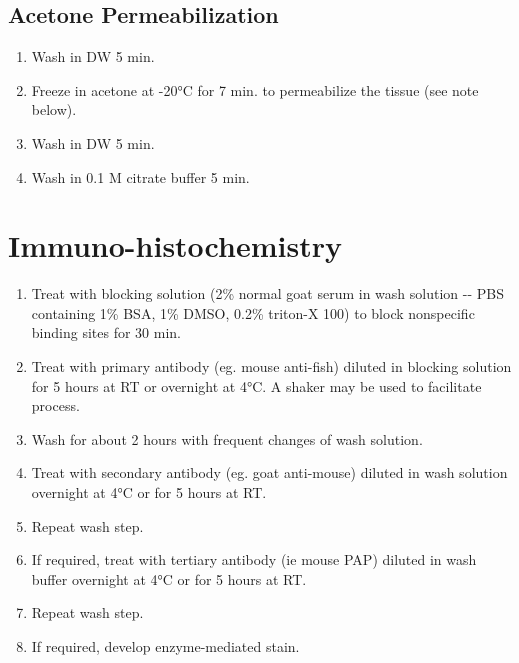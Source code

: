 \documentclass[
  letterpaper,
  DIV=11,
  numbers=noendperiod]{scrreprt}
\providecommand{\tightlist}{%
  \setlength{\itemsep}{0pt}\setlength{\parskip}{0pt}}\usepackage{longtable,booktabs,array}
\begin{document}
\hypertarget{acetone-permeabilization}{%
\subsection{Acetone Permeabilization}\label{acetone-permeabilization}}

\begin{enumerate}
\def\labelenumi{\arabic{enumi}.}
\setcounter{enumi}{4}
\tightlist
\item
  Wash in DW 5 min.
\item
  Freeze in acetone at -20°C for 7 min. to permeabilize the tissue (see
  note below).
\item
  Wash in DW 5 min.
\item
  Wash in 0.1 M citrate buffer 5 min.
\end{enumerate}

\hypertarget{immuno-histochemistry}{%
\section{Immuno-histochemistry}\label{immuno-histochemistry}}

\begin{enumerate}
\def\labelenumi{\arabic{enumi}.}
\setcounter{enumi}{8}
\tightlist
\item
  Treat with blocking solution (2\% normal goat serum in wash solution
  -\/- PBS containing 1\% BSA, 1\% DMSO, 0.2\% triton-X 100) to block
  nonspecific binding sites for 30 min.
\item
  Treat with primary antibody (eg. mouse anti-fish) diluted in blocking
  solution for 5 hours at RT or overnight at 4°C. A shaker may be used
  to facilitate process.
\item
  Wash for about 2 hours with frequent changes of wash solution.
\item
  Treat with secondary antibody (eg. goat anti-mouse) diluted in wash
  solution overnight at 4°C or for 5 hours at RT.
\item
  Repeat wash step.
\item
  If required, treat with tertiary antibody (ie mouse PAP) diluted in
  wash buffer overnight at 4°C or for 5 hours at RT.
\item
  Repeat wash step.
\item
  If required, develop enzyme-mediated stain.
\end{enumerate}
\end{document}

